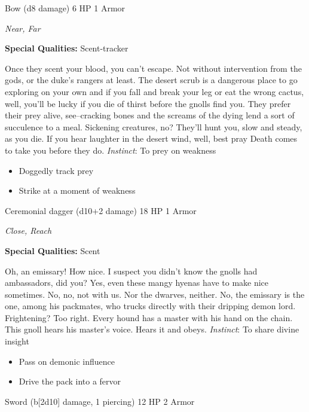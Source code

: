 Bow (d8 damage)\hspace*{\fill} 6 HP 1 Armor

\emph{Near, Far}

\textbf{Special Qualities:}
Scent-tracker

\HRule
Once they scent your blood, you can't escape. Not without intervention from the gods, or the duke's rangers at least. The desert scrub is a dangerous place to go exploring on your own and if you fall and break your leg or eat the wrong cactus, well, you'll be lucky if you die of thirst before the gnolls find you. They prefer their prey alive, see--cracking bones and the screams of the dying lend a sort of succulence to a meal. Sickening creatures, no? They'll hunt you, slow and steady, as you die. If you hear laughter in the desert wind, well, best pray Death comes to take you before they do. \emph{Instinct}: To prey on weakness
\begin{itemize}
\item Doggedly track prey
\item Strike at a moment of weakness
\end{itemize}

\HRule
{}

Ceremonial dagger (d10+2 damage)\hspace*{\fill} 18 HP 1 Armor

\emph{Close, Reach}

\textbf{Special Qualities:}
Scent

\HRule
Oh, an emissary! How nice. I suspect you didn't know the gnolls had ambassadors, did you? Yes, even these mangy hyenas have to make nice sometimes. No, no, not with us. Nor the dwarves, neither. No, the emissary is the one, among his packmates, who trucks directly with their dripping demon lord. Frightening? Too right. Every hound has a master with his hand on the chain. This gnoll hears his master's voice. Hears it and obeys. \emph{Instinct}: To share divine insight
\begin{itemize}
\item Pass on demonic influence
\item Drive the pack into a fervor
\end{itemize}
\newpage
\HRule
{}

Sword (b[2d10] damage, 1 piercing)\hspace*{\fill} 12 HP 2 Armor

